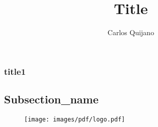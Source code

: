 \documentclass[handout]{beamer}
\begin{document}
\title{Title}
\author{Carlos Quijano}

\date{}%
\begin{frame}
\titlepage
\end{frame} 


\begin{frame}
\frametitle{title1}
\subsection{Subsection_name} 
\begin{figure}
\texttt{[image: images/pdf/logo.pdf]} 
\end{figure}
\end{frame}
\end{document}

